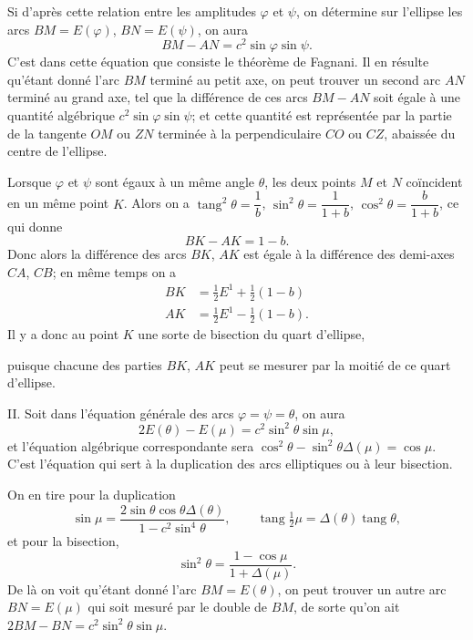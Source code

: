 \documentclass{article}
\begin{document}
Si d'après cette relation entre les amplitudes $\varphi$ et $\psi$, on détermine sur l'ellipse les arcs $BM=E(\varphi)$, $BN=E(\psi)$, on aura
\[ BM-AN=c^{2}\sin\varphi\sin\psi. \]
C'est dans cette équation que consiste le théorème de Fagnani. Il en résulte qu'étant donné l'arc $BM$ terminé au petit axe, on peut trouver un second arc $AN$ terminé au grand axe, tel que la différence de ces arcs $BM-AN$ soit égale à une quantité algébrique $c^{2}\sin\varphi\sin\psi$; et cette quantité est représentée par la partie de la tangente $OM$ ou $ZN$ terminée à la perpendiculaire $CO$ ou $CZ$, abaissée du centre de l'ellipse.

Lorsque $\varphi$ et $\psi$ sont égaux à un même angle $\theta$, les deux points $M$ et $N$ coïncident en un même point $K$. Alors on a $\operatorname{tang}^{2}\theta=\dfrac{1}{b}$, $\sin^{2}\theta=\dfrac{1}{1+b}$, $\cos^{2}\theta=\dfrac{b}{1+b}$, ce qui donne
\[ BK-AK=1-b. \]
Donc alors la différence des arcs $BK$, $AK$ est égale à la différence des demi-axes $CA$, $CB$; en même temps on a
\[ \begin{aligned} BK &= \tfrac{1}{2}E^{1}+\tfrac{1}{2}(1-b) \\ AK &= \tfrac{1}{2}E^{1}-\tfrac{1}{2}(1-b). \end{aligned} \]
Il y a donc au point $K$ une sorte de bisection du quart d'ellipse,

puisque chacune des parties $BK$, $AK$ peut se mesurer par la moitié de ce quart d'ellipse.

II. Soit dans l'équation générale des arcs $\varphi=\psi=\theta$, on aura
\[ 2E(\theta)-E(\mu)=c^{2}\sin^{2}\theta\sin\mu, \]
et l'équation algébrique correspondante sera $\cos^{2}\theta-\sin^{2}\theta\Delta(\mu)=\cos\mu$. C'est l'équation qui sert à la duplication des arcs elliptiques ou à leur bisection.

On en tire pour la duplication
\[ \sin\mu=\frac{2\sin\theta\cos\theta\Delta(\theta)}{1-c^{2}\sin^{4}\theta},\qquad \operatorname{tang}\tfrac{1}{2}\mu=\Delta(\theta)\operatorname{tang}\theta, \]
et pour la bisection,
\[ \sin^{2}\theta=\frac{1-\cos\mu}{1+\Delta(\mu)}. \]
De là on voit qu'étant donné l'arc $BM=E(\theta)$, on peut trouver un autre arc $BN=E(\mu)$ qui soit mesuré par le double de $BM$, de sorte qu'on ait $2BM-BN=c^{2}\sin^{2}\theta\sin\mu$.

\end{document}
